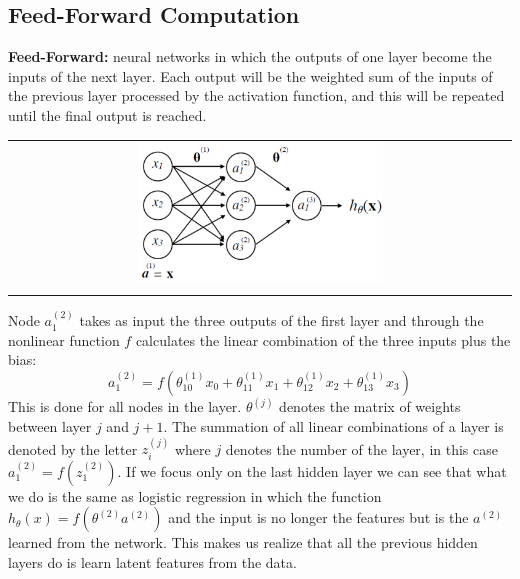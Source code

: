 \subsection{Feed-Forward Computation}
\begin{mdframed}
    \textbf{Feed-Forward:} neural networks in which the outputs of one layer become the inputs of the next layer.   Each output will be the weighted sum of the inputs of the previous layer processed by the activation function, and this will be repeated until the final output is reached.
\end{mdframed}
\begin{center}
    \begin{tabular}{c}
        \\ \includegraphics[width=0.5\textwidth]{images/NeuralNetworks3.png} \\ \\
    \end{tabular}
\end{center}
Node $a_1^{(2)}$ takes as input the three outputs of the first layer and through the nonlinear function $f$ calculates the linear combination of the three inputs plus the bias:
\begin{equation} \tag*{}
    a_1^{(2)} = f(\theta_{10}^(1)x_0 + \theta_{11}^(1)x_1 + \theta_{12}^(1)x_2 + \theta_{13}^(1)x_3)
\end{equation}
This is done for all nodes in the layer.
$\theta^{(j)}$ denotes the matrix of weights between layer $j$ and $j+1$.
The summation of all linear combinations of a layer is denoted by the letter $z_i^{(j)}$ where $j$ denotes the number of the layer, in this case $a_1^{(2)} = f(z_1^{(2)})$.
If we focus only on the last hidden layer we can see that what we do is the same as logistic regression in which the function $h_\theta(x) =f(\theta^{(2)}a^{(2)})$ and the input is no longer the features but is the $a^{(2)}$ learned from the network.
This makes us realize that all the previous hidden layers do is learn latent features from the data.

